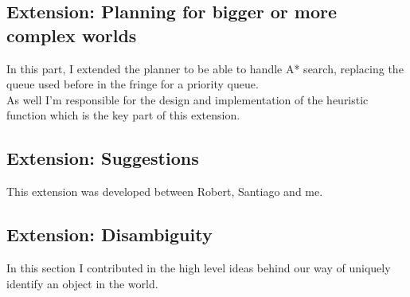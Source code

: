 \documentclass[11pt]{article}
\begin{document}
\subsection{Extension: Planning for bigger or more complex worlds}

In this part, I extended the planner to be able to handle A* search, replacing 
the queue used before in the fringe for a priority queue.  \\

As well I'm responsible for the design and implementation of the heuristic 
function which is the key part of this extension.  \\

\subsection{Extension: Suggestions}

This extension was developed between Robert, Santiago and me.  \\

\subsection{Extension: Disambiguity}

In this section I contributed in the high level ideas behind our way of 
uniquely identify an object in the world.  \\
\end{document}
